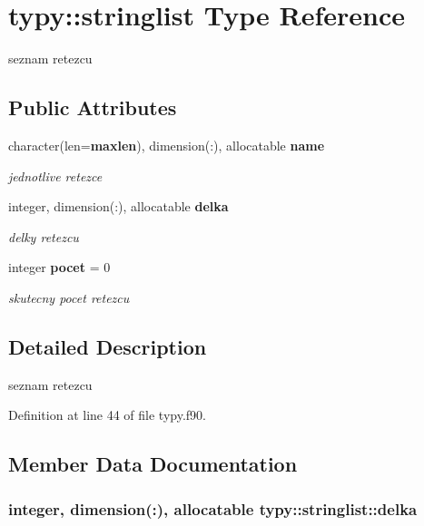 \section{typy\+:\+:stringlist Type Reference}
\label{structtypy_1_1stringlist}


seznam retezcu  


\subsection*{Public Attributes}
\begin{DoxyCompactItemize}
\item 
character(len={\bf maxlen}), dimension(\+:), allocatable {\bf name}
\begin{DoxyCompactList}\small\item\em jednotlive retezce \end{DoxyCompactList}\item 
integer, dimension(\+:), allocatable {\bf delka}
\begin{DoxyCompactList}\small\item\em delky retezcu \end{DoxyCompactList}\item 
integer {\bf pocet} = 0
\begin{DoxyCompactList}\small\item\em skutecny pocet retezcu \end{DoxyCompactList}\end{DoxyCompactItemize}


\subsection{Detailed Description}
seznam retezcu 

Definition at line 44 of file typy.\+f90.



\subsection{Member Data Documentation}
\subsubsection[{delka}]{\setlength{\rightskip}{0pt plus 5cm}integer, dimension(\+:), allocatable typy\+::stringlist\+::delka}\label{structtypy_1_1stringlist_ab2621a15d78ecef23d11495faf733487}


